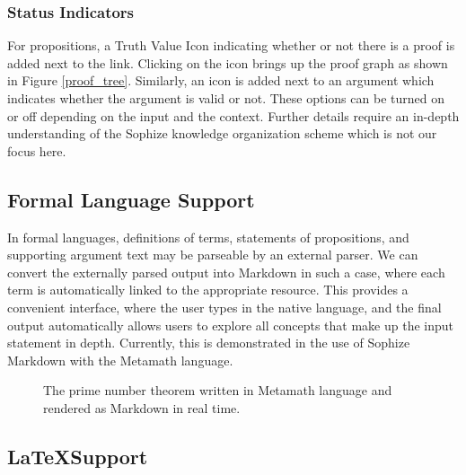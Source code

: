 \documentclass[]{ceurart}
\begin{document}
\subsubsection{Status Indicators}

For propositions, a Truth Value Icon indicating whether or not there is a proof is added next to the link. Clicking on the icon brings up the proof graph as shown in Figure \ref{proof_tree}. Similarly, an icon is added next to an argument which indicates whether the argument is valid or not. These options can be turned on or off depending on the input and the context. Further details require an in-depth understanding of the Sophize knowledge organization scheme which is not our focus here.

\subsection{Formal Language Support}

In formal languages, definitions of terms, statements of propositions, and supporting argument text may be parseable by an external parser. We can convert the externally parsed output into Markdown in such a case, where each term is automatically linked to the appropriate resource. This provides a convenient interface, where the user types in the native language, and the final output automatically allows users to explore all concepts that make up the input statement in depth. Currently, this is demonstrated in the use of Sophize Markdown with the Metamath language.

\begin{figure}[ht]
\begin{center}
\caption{The prime number theorem written in Metamath language and rendered as Markdown in real time.}
\label{formal}
\end{center}
\end{figure}

\subsection{\LaTeX\space Support}
\end{document}

